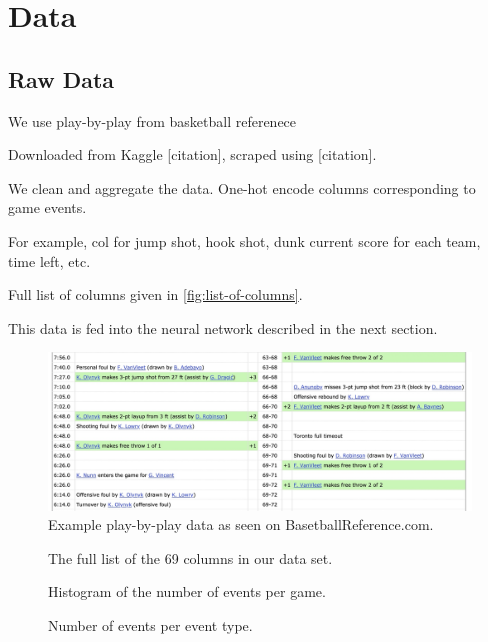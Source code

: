\section{Data}

\subsection{Raw Data}

We use play-by-play from basketball referenece

Downloaded from Kaggle [citation], scraped using [citation].

We clean and aggregate the data. One-hot encode columns corresponding to game events.

For example, col for jump shot, hook shot, dunk current score for each team, time left, etc.

Full list of columns given in \autoref{fig:list-of-columns}.

This data is fed into the neural network described in the next section.

\begin{figure}
	\includegraphics[width = .8 \textwidth]{figures/bbref-pbp.jpg}
	\caption{Example play-by-play data as seen on BasetballReference.com.}
\end{figure}

\begin{figure}
	\caption{The full list of the 69 columns in our data set.}
\end{figure}

\begin{figure}
	\caption{Histogram of the number of events per game.}
\end{figure}

\begin{figure}
	\caption{Number of events per event type.}
\end{figure}
